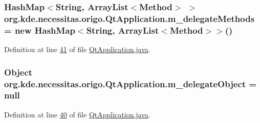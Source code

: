 \hypertarget{classorg_1_1kde_1_1necessitas_1_1origo_1_1_qt_application_a011b58e35a86b2e68c73c08bba0d4401}{
\subsubsection[{m\-\_\-delegate\-Methods}]{\setlength{\rightskip}{0pt plus 5cm}Hash\-Map$<$String, Array\-List$<$Method$>$ $>$ org.\-kde.\-necessitas.\-origo.\-Qt\-Application.\-m\-\_\-delegate\-Methods = new Hash\-Map$<$String, Array\-List$<$Method$>$$>$()\hspace{0.3cm}{\ttfamily [static]}}}\label{d0/da0/classorg_1_1kde_1_1necessitas_1_1origo_1_1_qt_application_a011b58e35a86b2e68c73c08bba0d4401}


Definition at line \hyperlink{_qt_application_8java_source_l00041}{41} of file \hyperlink{_qt_application_8java_source}{Qt\-Application.\-java}.

\hypertarget{classorg_1_1kde_1_1necessitas_1_1origo_1_1_qt_application_a29798ea60f352144962f0b83b585a140}{
\subsubsection[{m\-\_\-delegate\-Object}]{\setlength{\rightskip}{0pt plus 5cm}Object org.\-kde.\-necessitas.\-origo.\-Qt\-Application.\-m\-\_\-delegate\-Object = null\hspace{0.3cm}{\ttfamily [static]}}}\label{d0/da0/classorg_1_1kde_1_1necessitas_1_1origo_1_1_qt_application_a29798ea60f352144962f0b83b585a140}


Definition at line \hyperlink{_qt_application_8java_source_l00040}{40} of file \hyperlink{_qt_application_8java_source}{Qt\-Application.\-java}.

